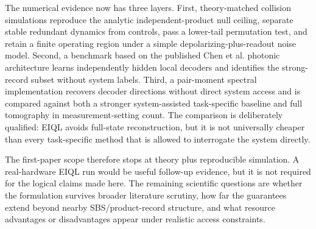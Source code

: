 The numerical evidence now has three layers. First, theory-matched collision simulations reproduce the analytic independent-product null ceiling, separate stable redundant dynamics from controls, pass a lower-tail permutation test, and retain a finite operating region under a simple depolarizing-plus-readout noise model. Second, a benchmark based on the published Chen et al. photonic architecture learns independently hidden local decoders and identifies the strong-record subset without system labels. Third, a pair-moment spectral implementation recovers decoder directions without direct system access and is compared against both a stronger system-assisted task-specific baseline and full tomography in measurement-setting count. The comparison is deliberately qualified: EIQL avoids full-state reconstruction, but it is not universally cheaper than every task-specific method that is allowed to interrogate the system directly.

The first-paper scope therefore stops at theory plus reproducible simulation. A real-hardware EIQL run would be useful follow-up evidence, but it is not required for the logical claims made here. The remaining scientific questions are whether the formulation survives broader literature scrutiny, how far the guarantees extend beyond nearby SBS/product-record structure, and what resource advantages or disadvantages appear under realistic access constraints.

